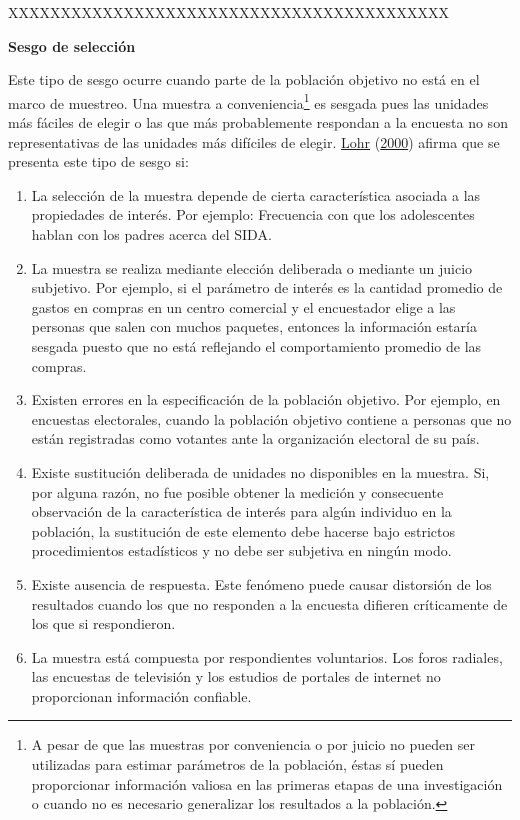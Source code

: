 \documentclass[
  12pt,
  spanish,
]{book}
\begin{document}
XXXXXXXXXXXXXXXXXXXXXXXXXXXXXXXXXXXXXXXXXX

\textbf{Sesgo de selección}

Este tipo de sesgo ocurre cuando parte de la población objetivo no está en el marco de muestreo. Una muestra a conveniencia\footnote{A pesar de que las muestras por conveniencia o por juicio no pueden ser utilizadas para estimar parámetros de la población, éstas sí pueden proporcionar información valiosa en las primeras etapas de una investigación o cuando no es necesario generalizar los resultados a la población.} es sesgada pues las unidades más fáciles de elegir o las que más probablemente respondan a la encuesta no son representativas de las unidades más difíciles de elegir. \protect\hyperlink{ref-Loh}{Lohr} (\protect\hyperlink{ref-Loh}{2000}) afirma que se presenta este tipo de sesgo si:

\begin{enumerate}
\item La selección de la muestra depende de cierta característica asociada a las propiedades de interés. Por ejemplo: Frecuencia con que los adolescentes hablan con los padres acerca del SIDA.
\item La muestra se realiza mediante elección deliberada o mediante un juicio subjetivo. Por ejemplo, si el parámetro de interés es la cantidad promedio de gastos en compras en un centro comercial y el encuestador elige a las personas que salen con muchos paquetes, entonces la información estaría sesgada puesto que no está reflejando el comportamiento promedio de las compras.
\item Existen errores en la especificación de la población objetivo. Por ejemplo, en encuestas electorales, cuando la población objetivo contiene a personas que no están registradas como votantes ante la organización electoral de su país.
\item Existe sustitución deliberada de unidades no disponibles en la muestra. Si, por alguna razón, no fue posible obtener la medición y consecuente observación de la característica de interés para algún individuo en la población, la sustitución de este elemento debe hacerse bajo estrictos procedimientos estadísticos y no debe ser subjetiva en ningún modo.
\item Existe ausencia de respuesta. Este fenómeno puede causar distorsión de los resultados cuando los que no responden a la encuesta difieren críticamente de los que si respondieron.
\item La muestra está compuesta por respondientes voluntarios. Los foros radiales, las encuestas de televisión y los estudios de portales de internet no proporcionan información confiable.
\end{enumerate}
\end{document}
